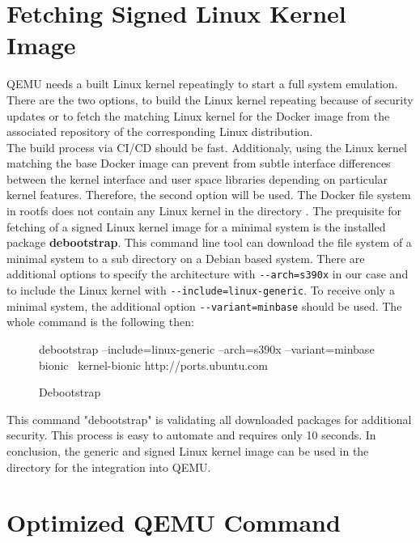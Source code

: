 \section{Fetching Signed Linux Kernel Image} \label{LinuxKernel}

QEMU needs a built Linux kernel repeatingly to start a full system emulation. There are the two options, to build the Linux kernel repeating because of security updates or to fetch the matching Linux kernel for the Docker image from the associated repository of the corresponding Linux distribution. \\ 
The build process via CI/CD should be fast. Additionaly, using the Linux kernel matching the base Docker image can prevent from subtle interface differences between the kernel interface and user space libraries depending on particular kernel features. 
Therefore, the second option will be used. The Docker file system in rootfs does not contain any Linux kernel in the directory .
The prequisite for fetching of a signed Linux kernel image for a minimal system is the installed package \textbf{debootstrap}. This command line tool can download the file system of a minimal system to a sub directory on a Debian based system. There are additional options to specify the architecture with \lstinline!--arch=s390x! in our case and to include the Linux kernel with \lstinline!--include=linux-generic!. To receive only a minimal system, the additional option \lstinline!--variant=minbase! should be used. The whole command is the following then: \\
\begin{figure}[H]
\begin{boxedverbatim}
debootstrap --include=linux-generic --arch=s390x --variant=minbase bionic \
kernel-bionic http://ports.ubuntu.com 
\end{boxedverbatim}
\caption{Debootstrap}
    \label{Debootstrap}
\end{figure}

This command "debootstrap" is validating all downloaded packages for additional security. This process is easy to automate and requires only 10 seconds. In conclusion, the generic and signed Linux kernel image can be used in the  directory for the integration into QEMU.
 

\section{Optimized QEMU Command}\label{Optimized-Qemu-Command}

